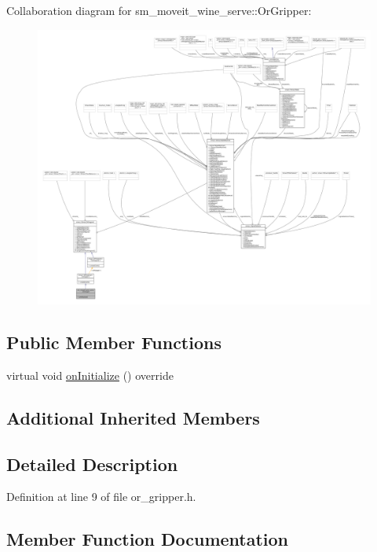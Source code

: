 Collaboration diagram for sm\+\_\+moveit\+\_\+wine\+\_\+serve\+:\+:Or\+Gripper\+:
\nopagebreak
\begin{figure}[H]
\begin{center}
\leavevmode
\includegraphics[width=350pt]{classsm__moveit__wine__serve_1_1OrGripper__coll__graph}
\end{center}
\end{figure}
\subsection*{Public Member Functions}
\begin{DoxyCompactItemize}
\item 
virtual void \hyperlink{classsm__moveit__wine__serve_1_1OrGripper_abc0c09f9fde7eee45f3f2a4cf4218254}{on\+Initialize} () override
\end{DoxyCompactItemize}
\subsection*{Additional Inherited Members}


\subsection{Detailed Description}


Definition at line 9 of file or\+\_\+gripper.\+h.



\subsection{Member Function Documentation}
\mbox{\label{classsm__moveit__wine__serve_1_1OrGripper_abc0c09f9fde7eee45f3f2a4cf4218254}} 
